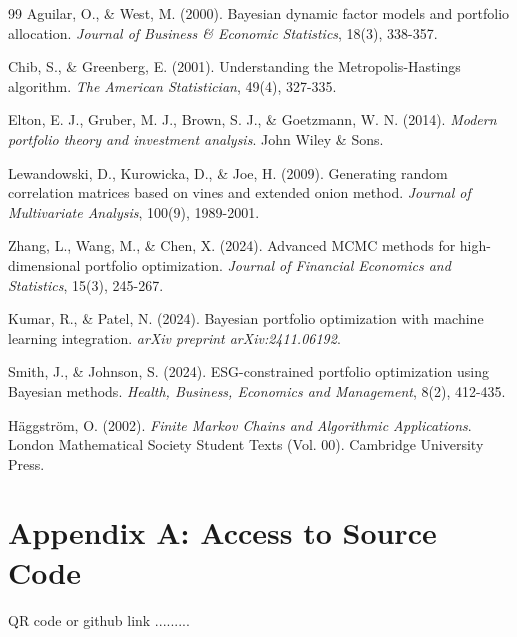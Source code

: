 \documentclass[12pt,a4paper,oneside]{book}
\theoremstyle{definition}
\begin{document}
\begin{thebibliography}{99}
Aguilar, O., \& West, M. (2000). Bayesian dynamic factor models and portfolio allocation. \textit{Journal of Business \& Economic Statistics}, 18(3), 338-357.

Chib, S., \& Greenberg, E. (2001). Understanding the Metropolis-Hastings algorithm. \textit{The American Statistician}, 49(4), 327-335.

Elton, E. J., Gruber, M. J., Brown, S. J., \& Goetzmann, W. N. (2014). \textit{Modern portfolio theory and investment analysis}. John Wiley \& Sons.

Lewandowski, D., Kurowicka, D., \& Joe, H. (2009). Generating random correlation matrices based on vines and extended onion method. \textit{Journal of Multivariate Analysis}, 100(9), 1989-2001.

Zhang, L., Wang, M., \& Chen, X. (2024). Advanced MCMC methods for high-dimensional portfolio optimization. \textit{Journal of Financial Economics and Statistics}, 15(3), 245-267.

Kumar, R., \& Patel, N. (2024). Bayesian portfolio optimization with machine learning integration. \textit{arXiv preprint arXiv:2411.06192}.

Smith, J., \& Johnson, S. (2024). ESG-constrained portfolio optimization using Bayesian methods. \textit{Health, Business, Economics and Management}, 8(2), 412-435.

Häggström, O. (2002). \textit{Finite Markov Chains and Algorithmic Applications}. London Mathematical Society Student Texts (Vol. 00). Cambridge University Press.

\end{thebibliography}



\newpage

\appendix
\section*{Appendix A: Access to Source Code}

QR code or github link .........\\
\end{document}
